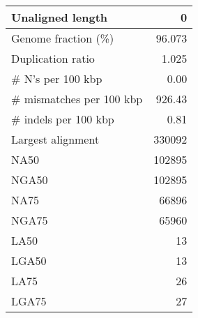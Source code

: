 \documentclass[12pt,a4paper]{article}
\begin{document}
\begin{table}[ht]
\begin{center}
\begin{tabular}{|l*{1}{|r}|}
Unaligned length & 0 \\ \hline
Genome fraction (\%) & 96.073 \\ \hline
Duplication ratio & 1.025 \\ \hline
\# N's per 100 kbp & 0.00 \\ \hline
\# mismatches per 100 kbp & 926.43 \\ \hline
\# indels per 100 kbp & 0.81 \\ \hline
Largest alignment & 330092 \\ \hline
NA50 & 102895 \\ \hline
NGA50 & 102895 \\ \hline
NA75 & 66896 \\ \hline
NGA75 & 65960 \\ \hline
LA50 & 13 \\ \hline
LGA50 & 13 \\ \hline
LA75 & 26 \\ \hline
LGA75 & 27 \\ \hline
\end{tabular}
\end{center}
\end{table}
\end{document}

